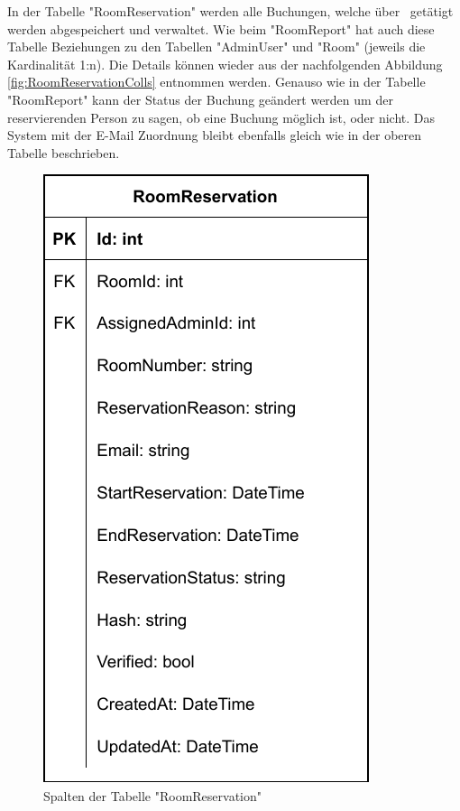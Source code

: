 
In der Tabelle "RoomReservation" werden alle Buchungen, welche über \ZELIA\ getätigt werden abgespeichert und verwaltet. Wie beim "RoomReport" hat auch diese Tabelle Beziehungen zu den Tabellen "AdminUser" und "Room" (jeweils die Kardinalität 1:n). Die Details können wieder aus der nachfolgenden Abbildung \ref{fig:RoomReservationColls} entnommen werden. Genauso wie in der Tabelle "RoomReport" kann der Status der Buchung geändert werden um der reservierenden Person zu sagen, ob eine Buchung möglich ist, oder nicht. Das System mit der E-Mail Zuordnung bleibt ebenfalls gleich wie in der oberen Tabelle beschrieben.

\begin{figure}[H]
    \centering
    \includegraphics{media/MariaDB/RoomReservation.svg.pdf}
    \caption{Spalten der Tabelle "RoomReservation"}
    \label{RoomReservationColls}
\end{figure}

